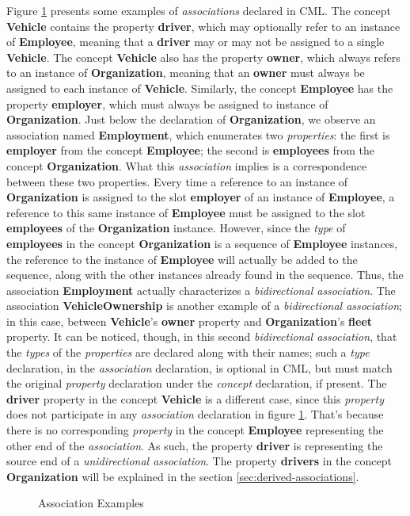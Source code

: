 \begin{examples}
Figure \ref{fig:ex:associations} presents some examples of \emph{associations} declared in CML.
The concept \textbf{Vehicle} contains the property \textbf{driver},
which may optionally refer to an instance of \textbf{Employee},
meaning that a \textbf{driver} may or may not be assigned to a single \textbf{Vehicle}.
The concept \textbf{Vehicle} also has the property \textbf{owner},
which always refers to an instance of \textbf{Organization},
meaning that an \textbf{owner} must always be assigned to each instance of \textbf{Vehicle}. 
Similarly,
the concept \textbf{Employee} has the property \textbf{employer},
which must always be assigned to instance of \textbf{Organization}.
Just below the declaration of \textbf{Organization},
we observe an association named \textbf{Employment},
which enumerates two \emph{properties}:
the first is \textbf{employer} from the concept \textbf{Employee};
the second is \textbf{employees} from the concept \textbf{Organization}.
What this \emph{association} implies is a correspondence between these two properties.
Every time a reference to an instance of \textbf{Organization} is assigned to
the slot \textbf{employer} of an instance of \textbf{Employee},
a reference to this same instance of \textbf{Employee} must be assigned to
the slot \textbf{employees} of the \textbf{Organization} instance.
However,
since the \emph{type} of \textbf{employees}
in the concept \textbf{Organization}
is a sequence of \textbf{Employee} instances,
the reference to the instance of \textbf{Employee} will actually be added to the sequence,
along with the other instances already found in the sequence.
Thus, the association \textbf{Employment} actually characterizes a \emph{bidirectional association}.
The association \textbf{VehicleOwnership} is another example of a \emph{bidirectional association};
in this case,
between \textbf{Vehicle}'s \textbf{owner} property and \textbf{Organization}'s \textbf{fleet} property.
It can be noticed, though, 
in this second \emph{bidirectional association},
that the \emph{types} of the \emph{properties} are declared along with their names;
such a \emph{type} declaration,
in the \emph{association} declaration,
is optional in CML,
but must match the original \emph{property} declaration under the \emph{concept} declaration,
if present.
The \textbf{driver} property in the concept \textbf{Vehicle} is a different case,
since this \emph{property} does not participate in any \emph{association} declaration
in figure \ref{fig:ex:associations}.
That's because there is no corresponding \emph{property} in the concept \textbf{Employee}
representing the other end of the \emph{association}.
As such, the property \textbf{driver} is representing the source end of a \emph{unidirectional association}.
The property \textbf{drivers} in the concept \textbf{Organization} will be explained
in the section \ref{sec:derived-associations}.
\end{examples}

\begin{figure}
\verbatimfont{\small}

\caption{Association Examples}
\label{fig:ex:associations}
\end{figure}
